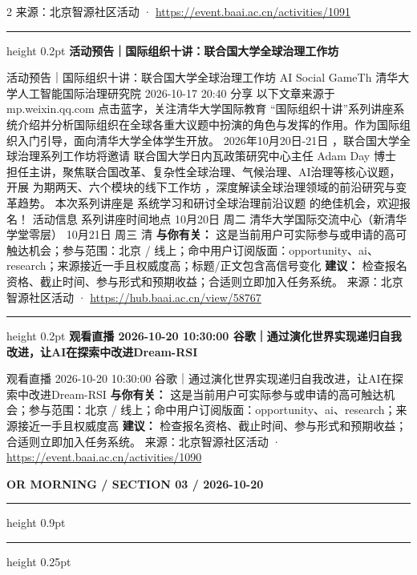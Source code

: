 \documentclass[10.5pt]{ctexart}
\begin{document}
\begin{multicols}{2}
{\footnotesize\color{ormuted} 来源：北京智源社区活动 · \url{https://event.baai.ac.cn/activities/1091}}
\vspace{2mm}
\hrule height 0.2pt
\vspace{2mm}
{\large\bfseries 活动预告｜国际组织十讲：联合国大学全球治理工作坊}\par
活动预告｜国际组织十讲：联合国大学全球治理工作坊 AI Social GameTh 清华大学人工智能国际治理研究院 2026-10-17 20:40 分享 以下文章来源于mp.weixin.qq.com 点击蓝字，关注清华大学国际教育 “国际组织十讲”系列讲座系统介绍并分析国际组织在全球各重大议题中扮演的角色与发挥的作用。作为国际组织入门引导，面向清华大学全体学生开放。 2026年10月20日-21日 ，联合国大学全球治理系列工作坊将邀请 联合国大学日内瓦政策研究中心主任 Adam Day 博士 担任主讲，聚焦联合国改革、复杂性全球治理、气候治理、AI治理等核心议题，开展 为期两天、六个模块的线下工作坊 ，深度解读全球治理领域的前沿研究与变革趋势。 本次系列讲座是 系统学习和研讨全球治理前沿议题 的绝佳机会，欢迎报名！ 活动信息 系列讲座时间地点 10月20日 周二 清华大学国际交流中心（新清华学堂零层） 10月21日 周三 清
\textbf{与你有关：} 这是当前用户可实际参与或申请的高可触达机会；参与范围：北京 / 线上；命中用户订阅版面：opportunity、ai、research；来源接近一手且权威度高；标题/正文包含高信号变化
\textbf{建议：} 检查报名资格、截止时间、参与形式和预期收益；合适则立即加入任务系统。
{\footnotesize\color{ormuted} 来源：北京智源社区活动 · \url{https://hub.baai.ac.cn/view/58767}}
\vspace{2mm}
\hrule height 0.2pt
\vspace{2mm}
{\large\bfseries 观看直播 2026-10-20 10:30:00 谷歌｜通过演化世界实现递归自我改进，让AI在探索中改进Dream-RSI}\par
观看直播 2026-10-20 10:30:00 谷歌｜通过演化世界实现递归自我改进，让AI在探索中改进Dream-RSI
\textbf{与你有关：} 这是当前用户可实际参与或申请的高可触达机会；参与范围：北京 / 线上；命中用户订阅版面：opportunity、ai、research；来源接近一手且权威度高
\textbf{建议：} 检查报名资格、截止时间、参与形式和预期收益；合适则立即加入任务系统。
{\footnotesize\color{ormuted} 来源：北京智源社区活动 · \url{https://event.baai.ac.cn/activities/1090}}
\end{multicols}
\newpage
{\small\bfseries OR MORNING / SECTION 03 / 2026-10-20}
\vspace{2mm}
\hrule height 0.9pt
\vspace{1.5mm}
\hrule height 0.25pt
\vspace{4mm}
\end{document}
